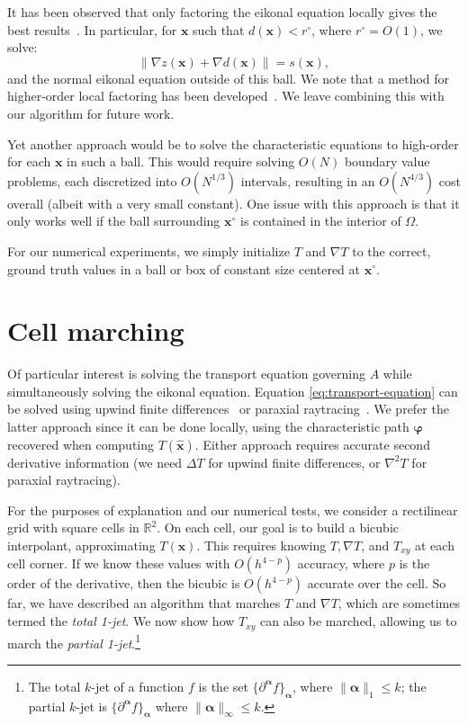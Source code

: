 \documentclass{siamart190516}
\renewcommand{\phi}{\varphi}
\newcommand{\m}[1]{\boldsymbol{#1}}
\newcommand{\xhat}{\hat{\m{x}}}
\newcommand{\mphi}{\m{\phi}}
\begin{document}
It has been observed that only factoring the eikonal equation locally
gives the best results~\cite{Qi:2019aa}. In particular, for $\m{x}$
such that $d(\m{x}) < r^\circ$, where $r^\circ = O(1)$, we solve:
\begin{equation}
  \|\nabla z(\m{x}) + \nabla d(\m{x})\| = s(\m{x}),
\end{equation}
and the normal eikonal equation outside of this ball. We note that a
method for higher-order local factoring has been
developed~\cite{Luo:2014aa}. We leave combining this with our
algorithm for future work.

Yet another approach would be to solve the characteristic equations to
high-order for each $\m{x}$ in such a ball. This would require solving
$O(N)$ boundary value problems, each discretized into $O(N^{1/3})$
intervals, resulting in an $O(N^{4/3})$ cost overall (albeit with a
very small constant). One issue with this approach is that it only
works well if the ball surrounding $\m{x}^\circ$ is contained in the
interior of $\Omega$.

For our numerical experiments, we simply initialize $T$ and $\nabla T$
to the correct, ground truth values in a ball or box of constant size
centered at $\m{x}^\circ$.

\section{Cell marching}

Of particular interest is solving the transport equation governing $A$
while simultaneously solving the eikonal equation. Equation
\eqref{eq:transport-equation} can be solved using upwind finite
differences~\cite{Benamou:1996aa} or paraxial
raytracing~\cite{Popov:2002aa}. We prefer the latter approach since it
can be done locally, using the characteristic path $\mphi$ recovered
when computing $T(\xhat)$. Either approach requires accurate second
derivative information (we need $\Delta T$ for upwind finite
differences, or $\nabla^2 T$ for paraxial raytracing).

For the purposes of explanation and our numerical tests, we consider a
rectilinear grid with square cells in $\mathbb{R}^2$. On each cell,
our goal is to build a bicubic interpolant, approximating
$T(\m{x})$. This requires knowing $T, \nabla T$, and $T_{xy}$ at each
cell corner. If we know these values with $O(h^{4-p})$ accuracy, where
$p$ is the order of the derivative, then the bicubic is $O(h^{4-p})$
accurate over the cell. So far, we have described an algorithm that
marches $T$ and $\nabla T$, which are sometimes termed the \emph{total
  1-jet}. We now show how $T_{xy}$ can also be marched, allowing us to
march the \emph{partial 1-jet}.\footnote{The total $k$-jet of a
  function $f$ is the set $\{\partial^{\m{\alpha}}f\}_{\m{\alpha}}$,
  where $\|\m{\alpha}\|_1 \leq k$; the partial $k$-jet is
  $\{\partial^{\m{\alpha}} f\}_{\m{\alpha}}$ where
  $\|\m{\alpha}\|_\infty \leq k$.}
\end{document}
